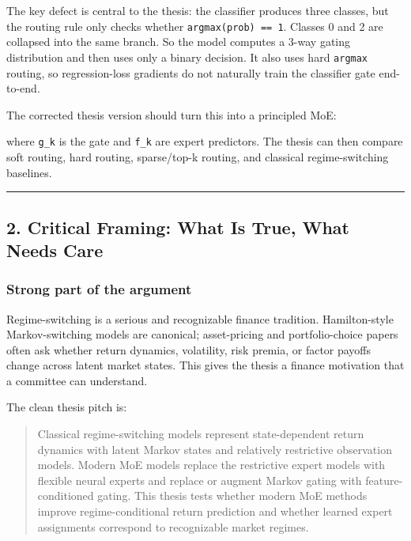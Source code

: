The key defect is central to the thesis: the classifier produces three
classes, but the routing rule only checks whether
\texttt{argmax(prob)\ ==\ 1}. Classes 0 and 2 are collapsed into the
same branch. So the model computes a 3-way gating distribution and then
uses only a binary decision. It also uses hard \texttt{argmax} routing,
so regression-loss gradients do not naturally train the classifier gate
end-to-end.

The corrected thesis version should turn this into a principled MoE:

\begin{Shaded}
\begin{Highlighting}[]
\end{Highlighting}
\end{Shaded}

where \texttt{g\_k} is the gate and \texttt{f\_k} are expert predictors.
The thesis can then compare soft routing, hard routing, sparse/top-k
routing, and classical regime-switching baselines.

\begin{center}\rule{0.5\linewidth}{0.5pt}\end{center}

\subsection{2. Critical Framing: What Is True, What Needs
Care}\label{critical-framing-what-is-true-what-needs-care}

\subsubsection{Strong part of the
argument}\label{strong-part-of-the-argument}

Regime-switching is a serious and recognizable finance tradition.
Hamilton-style Markov-switching models are canonical; asset-pricing and
portfolio-choice papers often ask whether return dynamics, volatility,
risk premia, or factor payoffs change across latent market states. This
gives the thesis a finance motivation that a committee can understand.

The clean thesis pitch is:

\begin{quote}
Classical regime-switching models represent state-dependent return
dynamics with latent Markov states and relatively restrictive
observation models. Modern MoE models replace the restrictive expert
models with flexible neural experts and replace or augment Markov gating
with feature-conditioned gating. This thesis tests whether modern MoE
methods improve regime-conditional return prediction and whether learned
expert assignments correspond to recognizable market regimes.
\end{quote}

